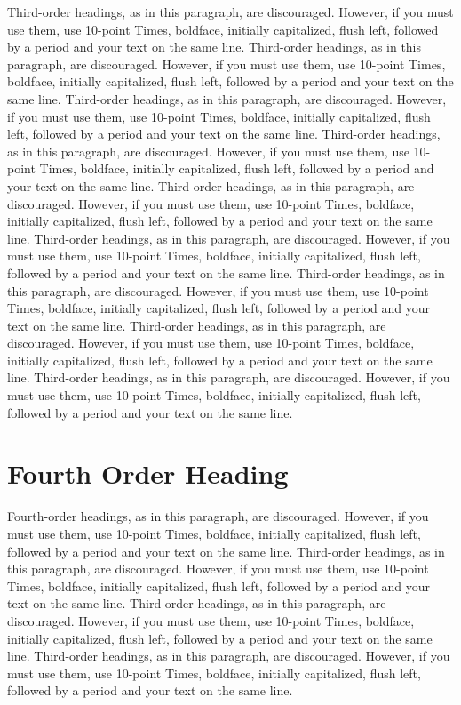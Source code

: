 \documentclass[10pt]{article}
\begin{document}
Third-order headings, as in this paragraph, are discouraged. However, if you must use them, use 10-point Times, boldface, initially capitalized, flush left, followed by a period and your text on the same line. 
Third-order headings, as in this paragraph, are discouraged. However, if you must use them, use 10-point Times, boldface, initially capitalized, flush left, followed by a period and your text on the same line. Third-order headings, as in this paragraph, are discouraged. However, if you must use them, use 10-point Times, boldface, initially capitalized, flush left, followed by a period and your text on the same line. Third-order headings, as in this paragraph, are discouraged. However, if you must use them, use 10-point Times, boldface, initially capitalized, flush left, followed by a period and your text on the same line. Third-order headings, as in this paragraph, are discouraged. However, if you must use them, use 10-point Times, boldface, initially capitalized, flush left, followed by a period and your text on the same line. Third-order headings, as in this paragraph, are discouraged. However, if you must use them, use 10-point Times, boldface, initially capitalized, flush left, followed by a period and your text on the same line. Third-order headings, as in this paragraph, are discouraged. However, if you must use them, use 10-point Times, boldface, initially capitalized, flush left, followed by a period and your text on the same line. Third-order headings, as in this paragraph, are discouraged. However, if you must use them, use 10-point Times, boldface, initially capitalized, flush left, followed by a period and your text on the same line. Third-order headings, as in this paragraph, are discouraged. However, if you must use them, use 10-point Times, boldface, initially capitalized, flush left, followed by a period and your text on the same line. 
\section{Fourth Order Heading}
Fourth-order headings, as in this paragraph, are discouraged. However, if you must use them, use 10-point Times, boldface, initially capitalized, flush left, followed by a period and your text on the same line. Third-order headings, as in this paragraph, are discouraged. However, if you must use them, use 10-point Times, boldface, initially capitalized, flush left, followed by a period and your text on the same line. 
Third-order headings, as in this paragraph, are discouraged. However, if you must use them, use 10-point Times, boldface, initially capitalized, flush left, followed by a period and your text on the same line. Third-order headings, as in this paragraph, are discouraged. However, if you must use them, use 10-point Times, boldface, initially capitalized, flush left, followed by a period and your text on the same line. 
\end{document}
